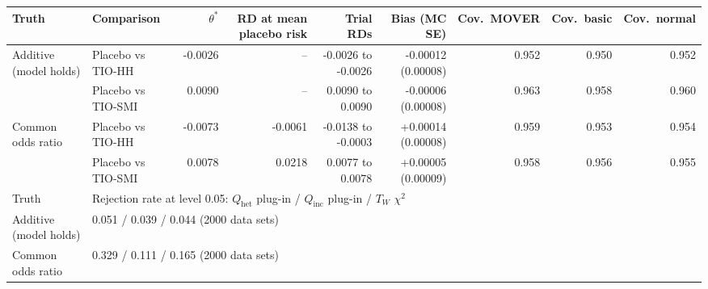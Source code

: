 \begin{tabular}{llrrrrrrr}
\toprule
Truth & Comparison & $\theta^*$ & RD at mean placebo risk & Trial RDs & Bias (MC SE) & Cov.\ MOVER & Cov.\ basic & Cov.\ normal \\
\midrule
Additive (model holds) & Placebo vs TIO-HH & -0.0026 & -- & -0.0026 to -0.0026 & -0.00012 (0.00008) & 0.952 & 0.950 & 0.952 \\
 & Placebo vs TIO-SMI & 0.0090 & -- & 0.0090 to 0.0090 & -0.00006 (0.00008) & 0.963 & 0.958 & 0.960 \\
Common odds ratio & Placebo vs TIO-HH & -0.0073 & -0.0061 & -0.0138 to -0.0003 & +0.00014 (0.00008) & 0.959 & 0.953 & 0.954 \\
 & Placebo vs TIO-SMI & 0.0078 & 0.0218 & 0.0077 to 0.0078 & +0.00005 (0.00009) & 0.958 & 0.956 & 0.955 \\
\midrule
Truth & \multicolumn{8}{l}{Rejection rate at level 0.05: $Q_{\mathrm{het}}$ plug-in / $Q_{\mathrm{inc}}$ plug-in / $T_W$ $\chi^2$} \\
\midrule
Additive (model holds) & \multicolumn{8}{l}{0.051 / 0.039 / 0.044  (2000 data sets)} \\
Common odds ratio & \multicolumn{8}{l}{0.329 / 0.111 / 0.165  (2000 data sets)} \\
\bottomrule
\end{tabular}
